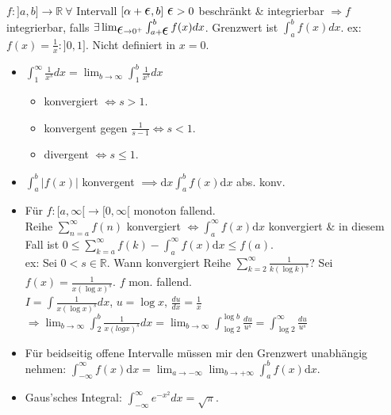 \documentclass[a4paper]{article}
\let\oldepsilon\epsilon
\renewcommand{\epsilon}{\text{\Large $\oldepsilon$}}
\newcommand\R{\ensuremath{\mathbb{R}}}
\begin{document}
\begin{mainbox}{} 
  $f: ]a,b] \rightarrow \R \ \forall$ Intervall $[\alpha + \epsilon, b] \ \epsilon > 0$ beschränkt \& integrierbar $\Rightarrow f$ integrierbar, falls $\exists \lim_{\epsilon \rightarrow 0^+} \int_{a + \epsilon}^b f(x)dx$. Grenzwert ist $\int_a^b f(x)dx$. 
  \tiny \color{gray}
    ex: $f(x) = \frac{1}{x}: ]0, 1]$. Nicht definiert in $x = 0$. \\
  \normalsize \color{black}
\end{mainbox} 

\begin{itemize}[leftmargin=4.5mm, topsep=1pt, parsep=1pt]
  \item $\int_{1}^{\infty} \frac{1}{x^s}dx = \lim_{b \to \infty} \int_{1}^{b} \frac{1}{x^s}dx$
      \begin{itemize}
        \item konvergiert $\iff s > 1$.
        \item konvergent gegen $\frac{1}{s-1} \iff s < 1$.
        \item divergent $\iff s \leq 1$.
      \end{itemize}
  \item $\int_{a}^{b} |f(x)|$ konvergent $\implies \mathrm{d}x\int_{a}^{b} f(x) \mathrm{d}x$ abs. konv.
  \item Für $f: [a, \infty[ \to [0, \infty[$ monoton fallend. \\
        Reihe $\sum_{n=a}^{\infty} f(n)$ konvergiert $\iff \int_{a}^{\infty} f(x) \mathrm{d}x$ konvergiert \& in diesem Fall ist $0 \le \sum_{k=a}^{\infty} f(k) - \int_{a}^{\infty} f(x) \mathrm{d}x \le f(a)$. \\
        \tiny \color{gray} 
          ex: Sei $0 < s \in \R$. Wann konvergiert Reihe $\sum_{k=2}^{\infty} \frac{1}{k(\log k)^s}$?
          Sei $f(x) = \frac{1}{x(\log x)^s}$. $f$ mon. fallend. \\
          $I = \int \frac{1}{x(\log x)^s}dx$, $u = \log x$, $\frac{du}{dx} = \frac{1}{x}$
          $ \Rightarrow \lim_{b \to \infty} \int_{2}^{b} \frac{1}{x(log x)^s}dx = \lim_{b \to \infty} \int_{\log 2}^{\log b} \frac{du}{u^s} = \int_{\log 2}^{\infty} \frac{du}{u^s}$
        \normalsize \color{black}
  \item Für beidseitig offene Intervalle müssen mir den Grenzwert unabhängig nehmen: $\int_{-\infty}^{\infty} f(x) \mathrm{d}x = \lim_{a \to -\infty} \lim_{b \to +\infty} \int_{a}^{b} f(x) \mathrm{d}x$.
  \item Gaus'sches Integral: $\int_{-\infty}^{\infty} e^{-x^2} dx = \sqrt{\pi}$.
\end{itemize}
\end{document}
